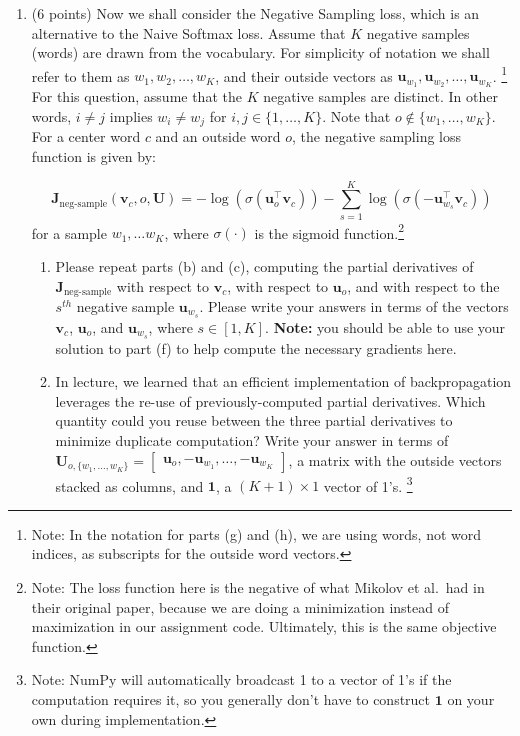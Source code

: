 \documentclass{article}
\begin{document}
\begin{enumerate}[label=(\alph*)]
    \item (6 points) Now we shall consider the Negative Sampling loss, which is an alternative to the Naive Softmax loss.  Assume that $K$ negative samples (words) are drawn from the vocabulary. For simplicity of notation we shall refer to them as $w_1, w_2, \dots, w_K$, and their outside vectors as $\bm u_{w_1}, \bm u_{w_2}, \dots, \bm u_{w_K}$. \footnote{Note: In the notation for parts (g) and (h), we are using words, not word indices, as subscripts for the outside word vectors.} For this question, assume that the $K$ negative samples are distinct. In other words, $i\neq j$ implies $w_i\neq w_j$ for $i,j\in\{1,\dots,K\}$.
          Note that $o\notin\{w_1, \dots, w_K\}$.
          For a center word $c$ and an outside word $o$, the negative sampling loss function is given by:

          \begin{equation}
              \bm J_{\text{neg-sample}}(\bm v_c, o, \bm U) = -\log(\sigma(\bm u_o^\top \bm v_c)) - \sum_{s=1}^K \log(\sigma(-\bm u_{w_s}^\top \bm v_c))
          \end{equation}
          for a sample $w_1, \ldots w_K$, where $\sigma(\cdot)$ is the sigmoid function.\footnote{Note: The loss function here is the negative of what Mikolov et al.\ had in their original paper, because we are doing a minimization instead of maximization in our assignment code. Ultimately, this is the same objective function.}

          \begin{enumerate}[label=(\roman*)]
              \item Please repeat parts (b) and (c), computing the partial derivatives of $\bm J_{\text{neg-sample}}$ with respect to $\bm v_c$, with respect to $\bm u_o$, and with respect to the $s^{th}$ negative sample $\bm u_{w_s}$. Please write your answers in terms of the vectors $\bm v_c$, $\bm u_o$, and $\bm u_{w_s}$, where $s \in [1, K]$. \textbf{Note:} you should be able to use your solution to part (f) to help compute the necessary gradients here.

              \item In lecture, we learned that an efficient implementation of backpropagation leverages the re-use of previously-computed partial derivatives. Which quantity could you reuse between the three partial derivatives to minimize duplicate computation? Write your answer in terms of \\ $\bm{U}_{o, \{w_1, \dots, w_K\}} = \begin{bmatrix} \bm{u}_o, -\bm{u}_{w_1}, \dots, -\bm{u}_{w_K} \end{bmatrix}$, a matrix with the outside vectors stacked as columns, and $\bm{1}$, a $(K + 1) \times 1$ vector of 1's. \footnote{Note: NumPy will automatically broadcast 1 to a vector of 1's if the computation requires it, so you generally don't have to construct $\bm{1}$ on your own during implementation.}


\end{enumerate}
\end{enumerate}
\end{document}

